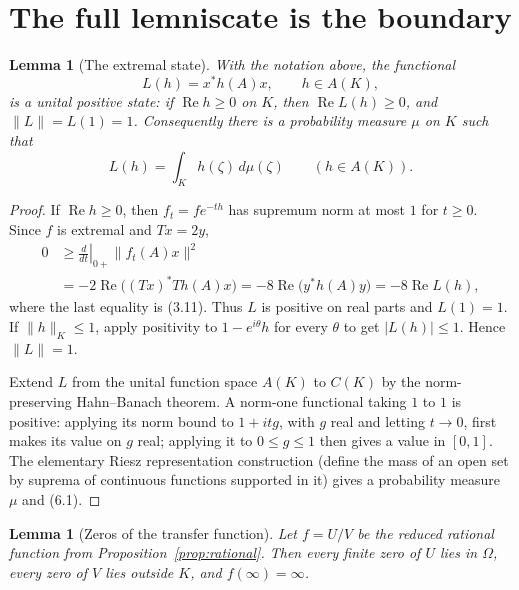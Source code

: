 \documentclass[11pt]{article}
\newtheorem{lemma}[theorem]{Lemma}
\theoremstyle{definition}
\theoremstyle{remark}
\newcommand{\Rea}{\operatorname{Re}}
\begin{document}
\section{The full lemniscate is the boundary}

\begin{lemma}[The extremal state]\label{lem:state}
With the notation above, the functional
\[
 L(h)=x^*h(A)x,\qquad h\in A(K),
\]
is a unital positive state: if \(\Rea h\geq0\) on \(K\), then
\(\Rea L(h)\geq0\), and \(\|L\|=L(1)=1\).  Consequently there is a probability
measure \(\mu\) on \(K\) such that
\[
 L(h)=\int_Kh(\zeta)\,d\mu(\zeta)\qquad(h\in A(K)).    \tag{6.1}
\]
\end{lemma}

\begin{proof}
If \(\Rea h\geq0\), then \(f_t=f e^{-th}\) has supremum norm at most \(1\) for
\(t\geq0\).  Since \(f\) is extremal and \(Tx=2y\),
\begin{align*}
 0&\geq\left.\frac d{dt}\right|_{0+}\|f_t(A)x\|^2\\
  &=-2\Rea\bigl((Tx)^*T h(A)x\bigr)
   =-8\Rea\bigl(y^*h(A)y\bigr)
   =-8\Rea L(h),
\end{align*}
where the last equality is (3.11).  Thus \(L\) is positive on real parts and
\(L(1)=1\).  If \(\|h\|_K\leq1\), apply positivity to
\(1-e^{i\theta}h\) for every \(\theta\) to get \(|L(h)|\leq1\).  Hence
\(\|L\|=1\).

Extend \(L\) from the unital function space \(A(K)\) to \(C(K)\) by the
norm-preserving Hahn--Banach theorem.  A norm-one functional taking \(1\) to
\(1\) is positive: applying its norm bound to \(1+it g\), with \(g\) real and
letting \(t\to0\), first makes its value on \(g\) real; applying it to
\(0\leq g\leq1\) then gives a value in \([0,1]\).  The elementary Riesz
representation construction (define the mass of an open set by suprema of
continuous functions supported in it) gives a probability measure \(\mu\)
and (6.1).
\end{proof}

\begin{lemma}[Zeros of the transfer function]\label{lem:zeros}
Let \(f=U/V\) be the reduced rational function from
Proposition~\ref{prop:rational}.  Then every finite zero of \(U\) lies in
\(\Omega\), every zero of \(V\) lies outside \(K\), and \(f(\infty)=\infty\).
\end{lemma}
\end{document}
